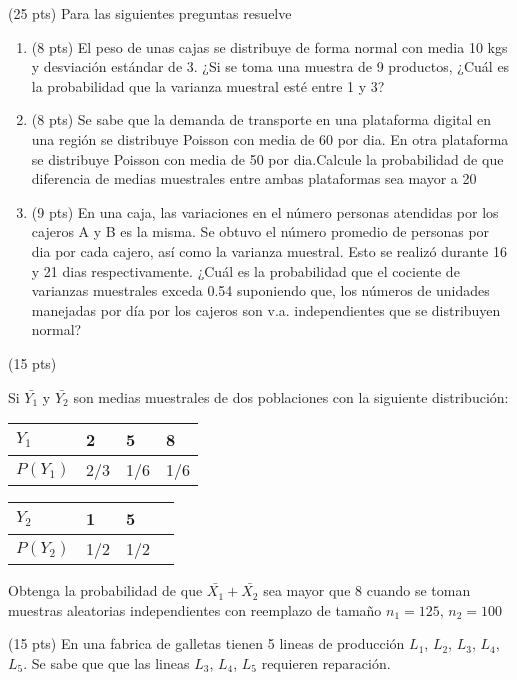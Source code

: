 \documentclass[addpoints]{exam}
\theoremstyle{mytheor}
\begin{document}
  \begin{questions} 

  \question (25 pts)
  Para las siguientes preguntas resuelve 
  \begin{enumerate}
  \item (8 pts) El peso de unas cajas se distribuye de forma normal con media 10 kgs y desviación estándar de 3. ¿Si se toma una muestra de 9 productos, ¿Cuál es la probabilidad que la varianza  muestral esté entre 1 y 3?
  \item (8 pts) Se sabe que la demanda de transporte en una plataforma digital en una región se distribuye Poisson con media de 60 por dia. En otra plataforma se distribuye Poisson con media de 50 por dia.Calcule la probabilidad de que diferencia de medias muestrales entre ambas plataformas sea mayor a 20
  \item (9 pts) En una caja, las variaciones en el número personas atendidas por los cajeros A y B es la misma. Se obtuvo el número promedio de personas por dia por cada cajero, así como la varianza muestral. Esto se realizó durante 16 y 21 dias respectivamente. ¿Cuál es la probabilidad que el cociente de varianzas muestrales exceda 0.54 suponiendo que, los números de unidades manejadas por día por los cajeros son v.a. independientes que se distribuyen normal?
  \end{enumerate}

\question (15 pts) 

Si $\bar{Y_1}$ y $\bar{Y_2}$ son medias muestrales de dos poblaciones con la siguiente distribución:

\begin{table}[h]
\centering
\begin{tabular}{llll}
$Y_1$ & 2 & 5 & 8 \\ \hline
$P(Y_1)$ & 2/3 & 1/6 & 1/6 
\end{tabular}
\end{table}

\begin{table}[h]
\centering
\begin{tabular}{llll}
$Y_2$ & 1 & 5 \\ \hline
$P(Y_2)$ & 1/2 & 1/2
\end{tabular}
\end{table}

Obtenga la probabilidad de que $\bar{X_1} + \bar{X_2}$ sea mayor que 8 cuando se toman muestras aleatorias independientes con reemplazo de tamaño $n_1 = 125$, $n_2 = 100$

 \question (15 pts) En una fabrica de galletas tienen 5 lineas de producción $L_1$, $L_2$, $L_3$, $L_4$, $L_5$. Se sabe que que las lineas $L_3$, $L_4$, $L_5$ requieren reparación.


\end{questions}
\end{document}
